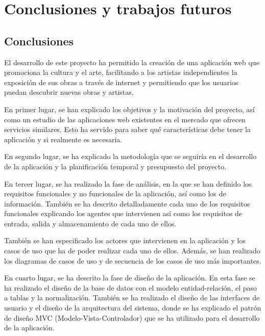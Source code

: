 \chapter{Conclusiones y trabajos futuros}

\section{Conclusiones}

El desarrollo de este proyecto ha permitido la creación de una aplicación web que promociona
la cultura y el arte, facilitando a los artistas independientes la exposición de sus obras a
través de internet y permitiendo que los usuarios puedan descubrir nuevas obras y artistas.

\vspace{0.5cm}

En primer lugar, se han explicado los objetivos y la motivación del proyecto, así como un
estudio de las aplicaciones web existentes en el mercado que ofrecen servicios similares.
Esto ha servido para saber qué características debe tener la aplicación y si realmente
es necesaria.

\vspace{0.5cm}

En segundo lugar, se ha explicado la metodología que se seguiría en el desarrollo de la
aplicación y la planificación temporal y presupuesto del proyecto.

\vspace{0.5cm}

En tercer lugar, se ha realizado la fase de análisis, en la que se han definido los
requisitos funcionales y no funcionales de la aplicación, así como los de información.
También se ha descrito detalladamente cada uno de los requisitos funcionales explicando
los agentes que intervienen así como los requisitos de entrada, salida y almacenamiento
de cada uno de ellos.

También se han especificado los actores que intervienen en la aplicación y los casos de
uso que ha de poder realizar cada uno de ellos. Además, se han realizado los diagramas
de casos de uso y de secuencia de los casos de uso más importantes.

\vspace{0.5cm}

En cuarto lugar, se ha descrito la fase de diseño de la aplicación. En esta fase se ha
realizado el diseño de la base de datos con el modelo entidad-relación, el paso a tablas
y la normalización. También se ha realizado el diseño de las interfaces de usuario y el
diseño de la arquitectura del sistema, donde se ha explicado el patrón de diseño MVC
(Modelo-Vista-Controlador) que se ha utilizado para el desarrollo de la aplicación.

